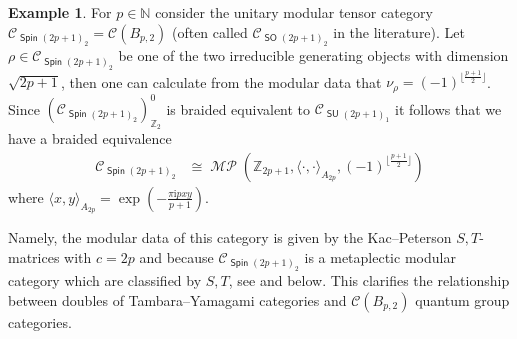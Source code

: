 \documentclass[twoside,11pt,reqno]{amsart}
\theoremstyle{definition}
\newtheorem{example}[thm]{Example}
\theoremstyle{remark}
\newcommand{\Spin}{\mathop{\mathsf{Spin}}}
\newcommand{\SO}{\mathop{\mathsf{SO}}}
\newcommand{\SU}{\mathop{\mathsf{SU}}}
\newcommand{\cC}{\mathcal{C}}
\newcommand{\ZZ}{\mathbb{Z}}
\newcommand{\NN}{\mathbb{N}}
\newcommand{\ima}{\mathrm{i}}
\DeclareMathOperator*{\MP}{\mathcal{MP}}
\newcommand{\umtc}[1]{\cC_{#1}}
\newcommand{\bi}[2]{\langle #1,#2\rangle}
\newcommand{\bislotslot}{\bi\cdot\cdot}
\begin{document}
\begin{example}
  \label{ex:Spin}
  For $p\in \NN$ consider the unitary modular tensor category
  $\umtc{\Spin(2p+1)_2}=\cC(B_{p,2})$ 
  (often called $\umtc{\SO(2p+1)_2}$ in the literature).
  Let $\rho\in\umtc{\Spin(2p+1)_2}$ be one of the two irreducible generating 
  objects with dimension $\sqrt{2p+1}$, then one can calculate from the 
  modular data that $\nu_\rho=(-1)^{\lfloor\frac{p+1}2\rfloor}$.
  Since $(\umtc{\Spin(2p+1)_2})_{\ZZ_2}^0$ is braided equivalent to 
  $\umtc{\SU(2p+1)_1}$ it follows that we have a braided equivalence
  \begin{align}
    \label{eq:Spin}
     \umtc{\Spin(2p+1)_2} &\cong
     \MP\left(\ZZ_{2p+1},\bislotslot_{A_{2p}},(-1)^{\lfloor\frac{p+1}2\rfloor}\right)
  \end{align}
  where 
  $\bi xy_{A_{2p}}=\exp(-\frac{\pi \ima p xy}{p+1})$.
  
  Namely, the modular data of this category is given by the 
  Kac--Peterson $S,T$-matrices 
  \cite{KaPe1984} with $c=2p$ and because 
  $\umtc{\Spin(2p+1)_2}$ is a metaplectic modular category
  which are classified by $S,T$, see \cite{ArChRoWa2016} and below. 
  This clarifies the relationship between doubles of Tambara--Yamagami
  categories and $\cC(B_{p,2})$ quantum group categories.
\end{example}
\end{document}
